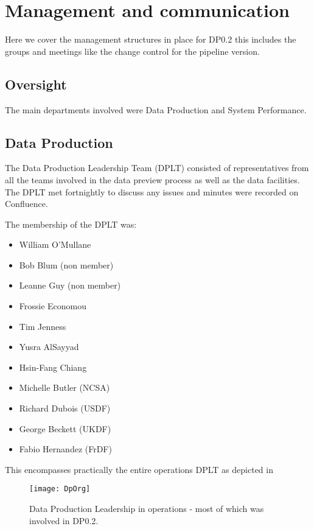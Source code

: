 \section{Management and communication} \label{sec:management}

Here we cover the management structures in place for DP0.2 this includes the groups and meetings like the change control for the pipeline version.

\subsection{Oversight}
The main departments involved were Data Production and System Performance.


\subsection{Data Production}
The Data Production Leadership Team (DPLT) consisted of representatives from all the teams involved in the data preview process as well as the data facilities.
The DPLT met fortnightly to discuss any issues and minutes were recorded on Confluence.

The membership of the DPLT was:

\begin{itemize}
\item William O'Mullane
\item Bob Blum (non member)
\item Leanne Guy (non member)
\item Frossie Economou
\item Tim Jenness
\item Yusra AlSayyad
\item Hsin-Fang Chiang
\item Michelle Butler (NCSA)
\item Richard Dubois (USDF)
\item George Beckett (UKDF)
\item Fabio Hernandez (FrDF)
\end{itemize}

This encompasses practically the entire operations DPLT as depicted in 

\begin{figure}
\texttt{[image: DpOrg]}
\caption{Data Production Leadership in operations - most of which was involved in DP0.2. \label{fig:DpOrg}}
\end{figure}

